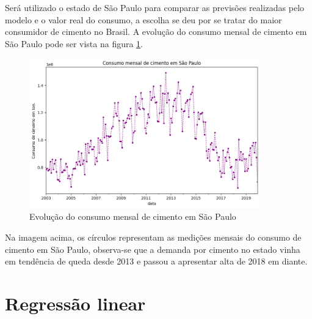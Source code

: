 Será utilizado o estado de São Paulo para comparar as previsões realizadas 
pelo modelo e o valor real do consumo, a escolha se deu por 
se tratar do maior consumidor de cimento no Brasil. A evolução do consumo 
mensal de cimento em São Paulo pode ser vista na figura \ref{consumo-sp}.

\begin{figure}[H]
    \centering
    \includegraphics[width=10cm]{../figuras/graficos/evolucao-consumo-sp.png}
    \caption{Evolução do consumo mensal de cimento em São Paulo}
    \label{consumo-sp}
\end{figure}

Na imagem acima, os círculos representam as medições mensais do consumo de 
cimento em São Paulo, observa-se que a demanda por cimento no estado vinha em tendência
de queda desde 2013 e passou a apresentar alta de 2018 em diante.


\section{Regressão linear}


